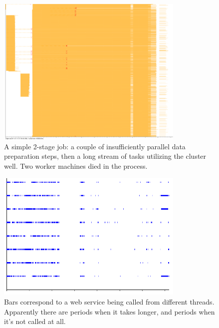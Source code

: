 \documentclass{article}
\begin{document}
\begin{figure}[p]
\center
\includegraphics[width=0.8\textwidth]{pics/splot/simple-2stage-job.png}
\caption{A simple 2-stage job: a couple of insufficiently parallel data preparation steps, then a long stream of tasks utilizing the cluster well. Two worker machines died in the process.}
\end{figure}

\begin{figure}[p]
\center
\includegraphics[width=0.8\textwidth]{pics/splot/8threads.png}
\caption{Bars correspond to a web service being called from different threads. Apparently there are periods when it takes longer, and periods when it's not called at all.}
\end{figure}
\end{document}
